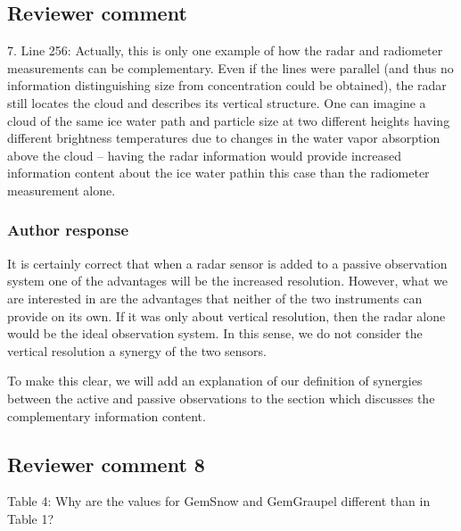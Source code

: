 \documentclass[11pt]{scrartcl}
\begin{document}
\subsection{Reviewer comment}

7. Line 256: Actually, this is only one example of how the radar and radiometer
measurements can be complementary. Even if the lines were parallel (and thus no
information distinguishing size from concentration could be obtained), the radar
still locates the cloud and describes its vertical structure. One can imagine a
cloud of the same ice water path and particle size at two different heights
having different brightness temperatures due to changes in the water vapor
absorption above the cloud – having the radar information would provide increased
information content about the ice water pathin this case than the radiometer
measurement alone.

\subsubsection*{Author response}

It is certainly correct that when a radar sensor is added to a passive
observation system one of the advantages will be the increased resolution.
However, what we are interested in are the advantages that neither of the two
instruments can provide on its own. If it was only about vertical resolution,
then the radar alone would be the ideal observation system. In this sense, we do
not consider the vertical resolution a synergy of the two sensors.

To make this clear, we will add an explanation of our definition of synergies
between the active and passive observations to the section which discusses the
complementary information content.




\subsection*{Reviewer comment 8}

Table 4: Why are the values for GemSnow and GemGraupel different than in Table 1?
\end{document}
